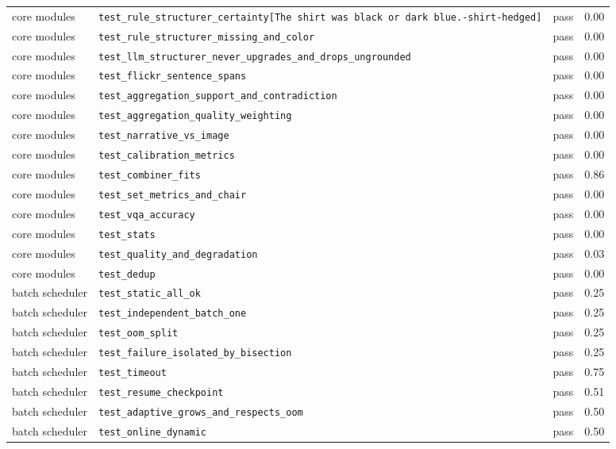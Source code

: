\begin{table}[!t]
\begin{adjustbox}{max width=\textwidth}
\begin{tabular}{llcr}
core modules & \texttt{test\_rule\_structurer\_certainty[The shirt was black or dark blue.-shirt-hedged]} & pass & 0.00 \\
core modules & \texttt{test\_rule\_structurer\_missing\_and\_color} & pass & 0.00 \\
core modules & \texttt{test\_llm\_structurer\_never\_upgrades\_and\_drops\_ungrounded} & pass & 0.00 \\
core modules & \texttt{test\_flickr\_sentence\_spans} & pass & 0.00 \\
core modules & \texttt{test\_aggregation\_support\_and\_contradiction} & pass & 0.00 \\
core modules & \texttt{test\_aggregation\_quality\_weighting} & pass & 0.00 \\
core modules & \texttt{test\_narrative\_vs\_image} & pass & 0.00 \\
core modules & \texttt{test\_calibration\_metrics} & pass & 0.00 \\
core modules & \texttt{test\_combiner\_fits} & pass & 0.86 \\
core modules & \texttt{test\_set\_metrics\_and\_chair} & pass & 0.00 \\
core modules & \texttt{test\_vqa\_accuracy} & pass & 0.00 \\
core modules & \texttt{test\_stats} & pass & 0.00 \\
core modules & \texttt{test\_quality\_and\_degradation} & pass & 0.03 \\
core modules & \texttt{test\_dedup} & pass & 0.00 \\
batch scheduler & \texttt{test\_static\_all\_ok} & pass & 0.25 \\
batch scheduler & \texttt{test\_independent\_batch\_one} & pass & 0.25 \\
batch scheduler & \texttt{test\_oom\_split} & pass & 0.25 \\
batch scheduler & \texttt{test\_failure\_isolated\_by\_bisection} & pass & 0.25 \\
batch scheduler & \texttt{test\_timeout} & pass & 0.75 \\
batch scheduler & \texttt{test\_resume\_checkpoint} & pass & 0.51 \\
batch scheduler & \texttt{test\_adaptive\_grows\_and\_respects\_oom} & pass & 0.50 \\
batch scheduler & \texttt{test\_online\_dynamic} & pass & 0.50 \\
\bottomrule
\end{tabular}
\end{adjustbox}
\end{table}
